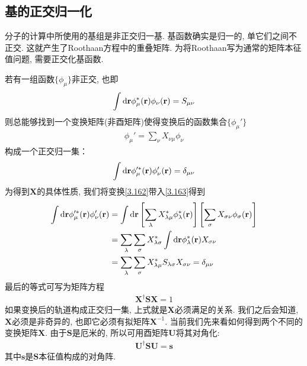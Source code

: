 \subsection{基的正交归一化}
分子的计算中所使用的基组是非正交归一基. 基函数确实是归一的, 单它们之间不正交. 这就产生了Roothaan方程中的重叠矩阵. 为将Roothaan写为通常的矩阵本征值问题, 需要正交化基函数.

若有一组函数$\{\phi_\mu\}$非正交, 也即
\begin{align}
\int\dd{r}\phi_\mu^*(\bfr)\phi_\nu(\bfr) = S_{\mu\nu}
\end{align}
则总能够找到一个变换矩阵(非酉矩阵)使得变换后的函数集合$\{\phi_\mu'\}$
\begin{align}\label{3.162}
\phi_\mu' = \sum_{\nu}X_{\nu\mu}\phi_\nu
\end{align}
构成一个正交归一集：
\begin{align}
\label{3.163}
\int\dd{r}\phi_\mu^{\prime*}(\bfr)\phi_\nu'(\bfr) = \delta_{\mu\nu}
\end{align}
为得到$\mathbf{X}$的具体性质, 我们将变换\eqref{3.162}带入\eqref{3.163}得到
\begin{align}
\int\dd{r}\phi_\mu^{\prime *}(\bfr)\phi_\nu^{\prime}(\bfr) & = \int\dd{r}\left[ \sum_{\lambda}X_{\lambda\mu}^*\phi_{\lambda}^*(\bfr)\right]\left[ \sum_\sigma X_{\sigma\nu}\phi_\sigma(\bfr) \right]\notag\\
& = \sum_\lambda\sum_\sigma X_{\lambda\sigma}^*\int\dd{r}\phi_\lambda^*(\bfr)X_{\sigma\nu}\notag\\
& = \sum_\lambda\sum_\sigma X_{\lambda\mu}^*S_{\lambda\sigma}X_{\sigma\nu} = \delta_{\mu\nu}
\end{align}
最后的等式可写为矩阵方程
\begin{align}\label{3.165}
\mathbf{X^\dagger SX}=1
\end{align}
如果变换后的轨道构成正交归一集, 上式就是$\mathbf{X}$必须满足的关系. 我们之后会知道, $\mathbf{X}$必须是非奇异的, 也即它必须有拟矩阵$\mathbf{X}^{-1}$. 当前我们先来看如何得到两个不同的变换矩阵$\mathbf{X}$. 由于$\mathbf{S}$是厄米的, 所以可用酉矩阵$\mathbf{U}$将其对角化:
\begin{align}
\mathbf{U^\dagger SU=s}
\end{align} 
其中$\mathbf{s}$是$\mathbf{S}$本征值构成的对角阵.


